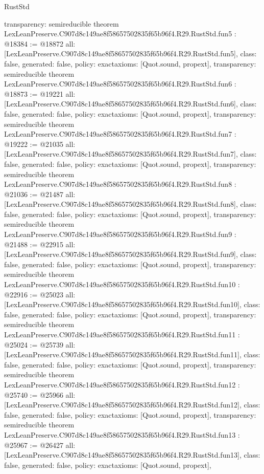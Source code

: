 \begin{lexlean}{RustStd}
\begin{coremodule}
{  transparency: semireducible
}
theorem LexLeanPreserve.C907d8c149ae8f58657502835f65b96f4.R29.RustStd.fun5 : @18384 := @18872 {
  all: [LexLeanPreserve.C907d8c149ae8f58657502835f65b96f4.R29.RustStd.fun5],
  class: false,
  generated: false,
  policy: exact{axioms: [Quot.sound, propext]},
  transparency: semireducible
}
theorem LexLeanPreserve.C907d8c149ae8f58657502835f65b96f4.R29.RustStd.fun6 : @18873 := @19221 {
  all: [LexLeanPreserve.C907d8c149ae8f58657502835f65b96f4.R29.RustStd.fun6],
  class: false,
  generated: false,
  policy: exact{axioms: [Quot.sound, propext]},
  transparency: semireducible
}
theorem LexLeanPreserve.C907d8c149ae8f58657502835f65b96f4.R29.RustStd.fun7 : @19222 := @21035 {
  all: [LexLeanPreserve.C907d8c149ae8f58657502835f65b96f4.R29.RustStd.fun7],
  class: false,
  generated: false,
  policy: exact{axioms: [Quot.sound, propext]},
  transparency: semireducible
}
theorem LexLeanPreserve.C907d8c149ae8f58657502835f65b96f4.R29.RustStd.fun8 : @21036 := @21487 {
  all: [LexLeanPreserve.C907d8c149ae8f58657502835f65b96f4.R29.RustStd.fun8],
  class: false,
  generated: false,
  policy: exact{axioms: [Quot.sound, propext]},
  transparency: semireducible
}
theorem LexLeanPreserve.C907d8c149ae8f58657502835f65b96f4.R29.RustStd.fun9 : @21488 := @22915 {
  all: [LexLeanPreserve.C907d8c149ae8f58657502835f65b96f4.R29.RustStd.fun9],
  class: false,
  generated: false,
  policy: exact{axioms: [Quot.sound, propext]},
  transparency: semireducible
}
theorem LexLeanPreserve.C907d8c149ae8f58657502835f65b96f4.R29.RustStd.fun10 : @22916 := @25023 {
  all: [LexLeanPreserve.C907d8c149ae8f58657502835f65b96f4.R29.RustStd.fun10],
  class: false,
  generated: false,
  policy: exact{axioms: [Quot.sound, propext]},
  transparency: semireducible
}
theorem LexLeanPreserve.C907d8c149ae8f58657502835f65b96f4.R29.RustStd.fun11 : @25024 := @25739 {
  all: [LexLeanPreserve.C907d8c149ae8f58657502835f65b96f4.R29.RustStd.fun11],
  class: false,
  generated: false,
  policy: exact{axioms: [Quot.sound, propext]},
  transparency: semireducible
}
theorem LexLeanPreserve.C907d8c149ae8f58657502835f65b96f4.R29.RustStd.fun12 : @25740 := @25966 {
  all: [LexLeanPreserve.C907d8c149ae8f58657502835f65b96f4.R29.RustStd.fun12],
  class: false,
  generated: false,
  policy: exact{axioms: [Quot.sound, propext]},
  transparency: semireducible
}
theorem LexLeanPreserve.C907d8c149ae8f58657502835f65b96f4.R29.RustStd.fun13 : @25967 := @26427 {
  all: [LexLeanPreserve.C907d8c149ae8f58657502835f65b96f4.R29.RustStd.fun13],
  class: false,
  generated: false,
  policy: exact{axioms: [Quot.sound, propext]},
}
\end{coremodule}
\end{lexlean}
